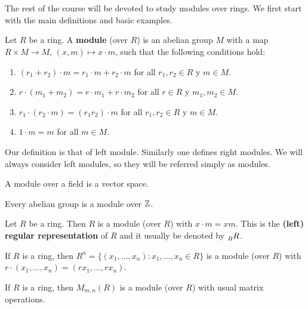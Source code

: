 \chapter{}


The rest of the course will be devoted to study modules over rings. 
We first start with the main definitions and basic examples.

\begin{definition}
    Let $R$ be a ring. A \textbf{module} (over $R$) is an abelian group
    $M$ with a map $R\times M\to M$, $(x,m)\mapsto x\cdot m$, such that
    the following conditions hold:
    \begin{enumerate}
        \item $(r_1+r_2)\cdot m=r_1\cdot m+r_2\cdot m$ for all $r_1,r_2\in R$ y $m\in M$.
		\item $r\cdot (m_1+m_2)=r\cdot m_1+r\cdot m_2$ for all $r\in R$ y $m_1,m_2\in M$.
		\item $r_1\cdot (r_2\cdot m)=(r_1r_2)\cdot m$ for all $r_1,r_2\in R$ y $m\in M$.
		\item $1\cdot m=m$ for all $m\in M$.	
    \end{enumerate}
\end{definition}

Our definition is that of left module. Similarly one defines right modules. We will always
consider left modules, so they will be referred simply as modules.

\begin{example}
A module over a field is a vector space. 
\end{example}

\begin{example}
Every abelian group is a module over $\mathbb{Z}$.	
\end{example}

\begin{example}
Let $R$ be a ring. Then $R$ is a module (over $R$) with $x\cdot m=xm$. 
This is the \textbf{(left) regular representation} of $R$ and it usually 
be denoted by $\prescript{}{R}R$. 
\end{example}

\begin{example}
If $R$ is a ring, then $R^n=\{(x_1,\dots,x_n):x_1,\dots,x_n\in R\}$ 
is a module (over $R$) with  
$r\cdot (x_1,\dots,x_n)=(rx_1,\dots,rx_n)$. 
\end{example}

\begin{example}
If $R$ is a ring, then $M_{m,n}(R)$ is a module (over $R$) with usual matrix operations. 
\end{example}

